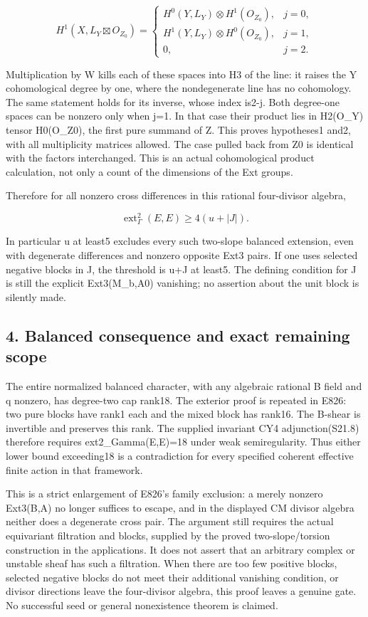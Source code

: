 \[
 H^1(X,L_Y\boxtimes O_{Z_0})=
 \begin{cases}
 H^0(Y,L_Y)\otimes H^1(O_{Z_0}),&j=0,\\
 H^1(Y,L_Y)\otimes H^0(O_{Z_0}),&j=1,\\
 0,&j=2.
 \end{cases}
 \tag{E827.9}
\]

Multiplication by W kills each of these spaces into H3 of the line: it
raises the Y cohomological degree by one, where the nondegenerate line has
no cohomology. The same statement holds for its inverse, whose index is2-j.
Both degree-one spaces can be nonzero only when j=1. In that case their
product lies in H2(O\_Y) tensor H0(O\_Z0), the first pure summand of Z. This
proves hypotheses1 and2, with all multiplicity matrices allowed. The case
pulled back from Z0 is identical with the factors interchanged. This is an
actual cohomological product calculation, not only a count of the dimensions
of the Ext groups.

Therefore for all nonzero cross differences in this rational four-divisor
algebra,

\[
 \operatorname{ext}^2_\Gamma(E,E)\ge4(u+|J|).
 \tag{E827.10}
\]

In particular u at least5 excludes every such two-slope balanced extension,
even with degenerate differences and nonzero opposite Ext3 pairs. If one
uses selected negative blocks in J, the threshold is u+\textbar J\textbar{}
at least5. The defining condition for J is still the explicit Ext3(M\_b,A0)
vanishing; no assertion about the unit block is silently made.

\subsection{4. Balanced consequence and exact remaining
scope}\label{SF-E827:balanced-consequence-and-exact-remaining-scope}

The entire normalized balanced character, with any algebraic rational B
field and q nonzero, has degree-two cap rank18. The exterior proof is
repeated in E826: two pure blocks have rank1 each and the mixed block has
rank16. The B-shear is invertible and preserves this rank. The supplied
invariant CY4 adjunction(S21.8) therefore requires ext2\_Gamma(E,E)=18 under
weak semiregularity. Thus either lower bound exceeding18 is a contradiction
for every specified coherent effective finite action in that framework.

This is a strict enlargement of E826's family exclusion: a merely nonzero
Ext3(B,A) no longer suffices to escape, and in the displayed CM divisor
algebra neither does a degenerate cross pair. The argument still requires
the actual equivariant filtration and blocks, supplied by the proved
two-slope/torsion construction in the applications. It does not assert that
an arbitrary complex or unstable sheaf has such a filtration. When there are
too few positive blocks, selected negative blocks do not meet their
additional vanishing condition, or divisor directions leave the four-divisor
algebra, this proof leaves a genuine gate. No successful seed or general
nonexistence theorem is claimed.

